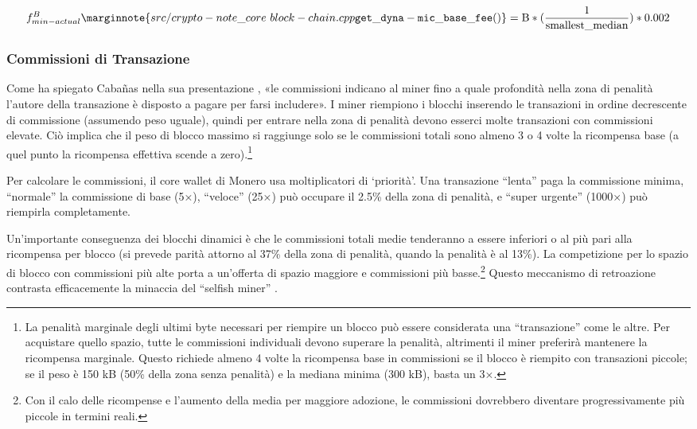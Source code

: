 \[f^{B}_{min-actual}\marginnote{src/crypto- note\_core\ block- chain.cpp {\tt get\_dyna- mic\_base\_ fee()}} = \textrm{B}*(\frac{1}{\textrm{smallest\_median}}) * 0.002\]

\subsubsection*{Commissioni di Transazione}

Come ha spiegato Caba\~nas nella sua presentazione \cite{articmine-36c3-dynamics}, «le commissioni indicano al miner fino a quale profondità nella zona di penalità l’autore della transazione è disposto a pagare per farsi includere». I miner riempiono i blocchi inserendo le transazioni in ordine decrescente di commissione (assumendo peso uguale), quindi per entrare nella zona di penalità devono esserci molte transazioni con commissioni elevate. Ciò implica che il peso di blocco massimo si raggiunge solo se le commissioni totali sono almeno 3 o 4 volte la ricompensa base (a quel punto la ricompensa effettiva scende a zero).\footnote{\label{penaltyzonecost_footnote}La penalità marginale degli ultimi byte necessari per riempire un blocco può essere considerata una “transazione” come le altre. Per acquistare quello spazio, tutte le commissioni individuali devono superare la penalità, altrimenti il miner preferirà mantenere la ricompensa marginale. Questo richiede almeno 4 volte la ricompensa base in commissioni se il blocco è riempito con transazioni piccole; se il peso è 150 kB (50\% della zona senza penalità) e la mediana minima (300 kB), basta un 3×.}

Per calcolare le commissioni, il core wallet di Monero usa moltiplicatori di `priorità’. Una transazione “lenta” paga la commissione minima, “normale” la commissione di base (5×), “veloce” (25×) può occupare il 2.5\% della zona di penalità, e “super urgente” (1000×) può riempirla completamente.

Un’importante conseguenza dei blocchi dinamici è che le commissioni totali medie tenderanno a essere inferiori o al più pari alla ricompensa per blocco (si prevede parità attorno al 37\% della zona di penalità, quando la penalità è al 13\%). La competizione per lo spazio di blocco con commissioni più alte porta a un’offerta di spazio maggiore e commissioni più basse.\footnote{Con il calo delle ricompense e l’aumento della media per maggiore adozione, le commissioni dovrebbero diventare progressivamente più piccole in termini reali.} Questo meccanismo di retroazione contrasta efficacemente la minaccia del “selfish miner” \cite{selfish-miner}.  


